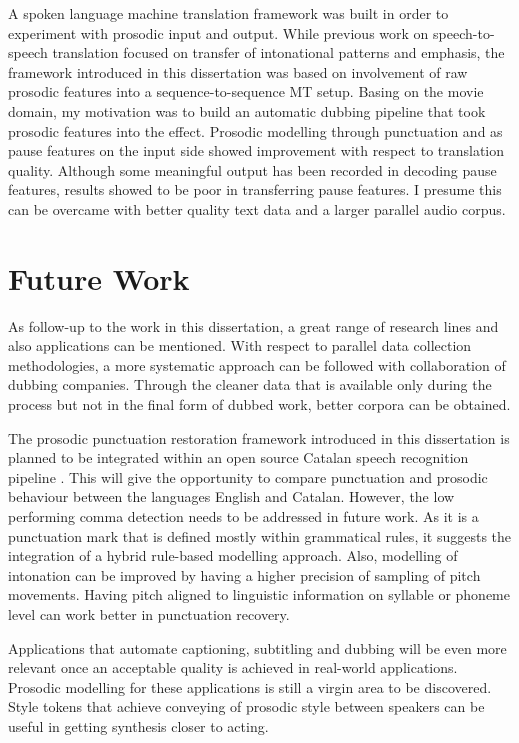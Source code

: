 A spoken language machine translation framework was built in order to experiment with prosodic input and output. While previous work on speech-to-speech translation focused on transfer of intonational patterns and emphasis, the framework introduced in this dissertation was based on involvement of raw prosodic features into a sequence-to-sequence MT setup. Basing on the movie domain, my motivation was to build an automatic dubbing pipeline that took prosodic features into the effect. Prosodic modelling through punctuation and as pause features on the input side showed improvement with respect to translation quality. Although some meaningful output has been recorded in decoding pause features, results showed to be poor in transferring pause features. I presume this can be overcame with better quality text data and a larger parallel audio corpus. 


\section{Future Work}
\label{conclusions:future}

As follow-up to the work in this dissertation, a great range of research lines and also applications can be mentioned. With respect to parallel data collection methodologies, a more systematic approach can be followed with collaboration of dubbing companies. Through the cleaner data that is available only during the process but not in the final form of dubbed work, better corpora can be obtained. 

The prosodic punctuation restoration framework introduced in this dissertation is planned to be integrated within an open source Catalan speech recognition pipeline \citep{Kulebi2018}. This will give the opportunity to compare punctuation and prosodic behaviour between the languages English and Catalan. However, the low performing comma detection needs to be addressed in future work. As it is a punctuation mark that is defined mostly within grammatical rules, it suggests the integration of a hybrid rule-based modelling approach. Also, modelling of intonation can be improved by having a higher precision of sampling of pitch movements. Having pitch aligned to linguistic information on syllable or phoneme level can work better in punctuation recovery. 

Applications that automate captioning, subtitling and dubbing will be even more relevant once an acceptable quality is achieved in real-world applications. Prosodic modelling for these applications is still a virgin area to be discovered. Style tokens \citep{style_tokens} that achieve conveying of prosodic style between speakers can be useful in getting synthesis closer to acting. 

